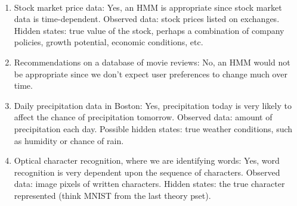 \documentclass[12pt]{article}
\begin{document}
\newpage
{}
\\
\begin{solution}
\begin{enumerate}
	\item Stock market price data:
	Yes, an HMM is appropriate since stock market data is time-dependent. Observed data: stock prices listed on exchanges. Hidden states: true value of the stock, perhaps a combination of company policies, growth potential, economic conditions, etc.
	\item Recommendations on a database of movie reviews:
	No, an HMM would not be appropriate since we don't expect user preferences to change much over time.
	\item Daily precipitation data in Boston:
	Yes, precipitation today is very likely to affect the chance of precipitation tomorrow. Observed data: amount of precipitation each day. Possible hidden states: true weather conditions, such as humidity or chance of rain.
	\item Optical character recognition, where we are identifying words:
	Yes, word recognition is very dependent upon the sequence of characters. Observed data: image pixels of written characters. Hidden states: the true character represented (think MNIST from the last theory pset). 
\end{enumerate}
\end{solution}
\end{document}
